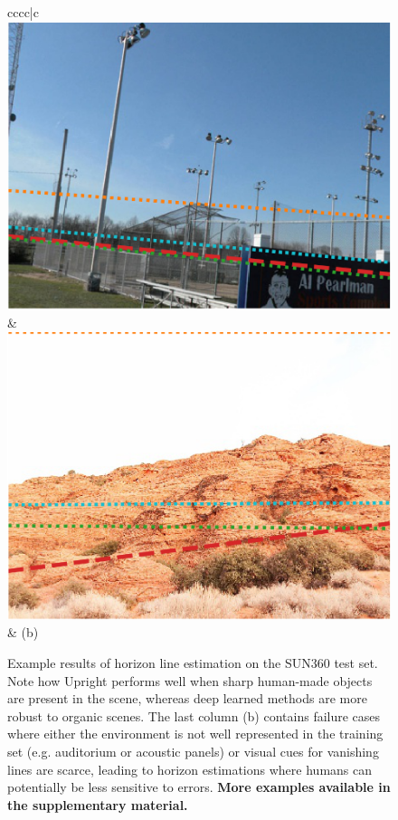 \begin{figure}
\begin{tabular}{cccc|c}
\includegraphics[width=\exampleresultswidth\linewidth]{figures/method/results/pano_ayfwzaseviqbww_jpg-2.png} &
\includegraphics[width=\exampleresultswidth\linewidth]{figures/method/failures/pano_addyndxkhjhutl_jpg-3.png} \\
 & (b) \\
\end{tabular}
\egroup
\caption[Example results of horizon line estimation]{Example results of horizon line estimation on the SUN360 test set. Note how Upright performs well when sharp human-made objects are present in the scene, whereas deep learned methods are more robust to organic scenes. The last column (b) contains failure cases where either the environment is not well represented in the training set (e.g. auditorium or acoustic panels) or visual cues for vanishing lines are scarce, leading to horizon estimations where humans can potentially be less sensitive to errors. \textbf{More examples available in the supplementary material.}\vspace{-1em}}
\label{fig:method_example_results}
\end{figure}

